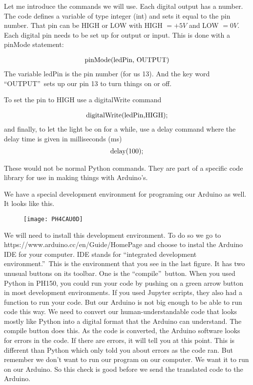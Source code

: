 Let me introduce the commands we will use. Each digital output has a number.
The code defines a variable of type integer (int) and sets it equal to the
pin number. That pin can be HIGH or LOW with HIGH $=+5\unit{V}$ and LOW $=0%
\unit{V}$. Each digital pin needs to be set up for output or input. This is
done with a pinMode statement:

\begin{equation*}
\begin{tabular}{l}
pinMode(ledPin, OUTPUT)%
\end{tabular}%
\end{equation*}%
The variable ledPin is the pin number (for us 13). And the key word
\textquotedblleft OUTPUT\textquotedblright\ sets up our pin 13 to turn
things on or off.

To set the pin to HIGH use a digitalWrite command

\begin{equation*}
\begin{tabular}{l}
digitalWrite(ledPin,HIGH);%
\end{tabular}%
\end{equation*}%
and finally, to let the light be on for a while, use a delay command where
the delay time is given in milliseconds (ms)%
\begin{equation*}
\begin{tabular}{l}
delay(100);%
\end{tabular}%
\end{equation*}

These would not be normal Python commands. They are part of a specific code
library for use in making things with Arduino's.

We have a special development environment for programing our Arduino as
well. It looks like this. \begin{figure}[h!]
\texttt{[image: PH4CAU0D]}
\end{figure}We will need to install this
development environment. To do so we go to
https://www.arduino.cc/en/Guide/HomePage and choose to instal the Arduino
IDE for your computer. IDE stands for \textquotedblleft integrated
development environment.\textquotedblright\ This is the environment that you
see in the last figure. It has two unusual buttons on its toolbar. One is
the \textquotedblleft compile\textquotedblright\ button. When you used
Python in PH150, you could run your code by pushing on a green arrow button
in most development environments. If you used Jupyter scripts, they also had
a function to run your code. But our Arduino is not big enough to be able to
run code this way. We need to convert our human-understandable code that
looks mostly like Python into a digital format that the Arduino can
understand. The compile button does this. As the code is converted, the
Arduino software looks for errors in the code. If there are errors, it will
tell you at this point. This is different than Python which only told you
about errors as the code ran. But remember we don't want to run our program
on our computer. We want it to run on our Arduino. So this check is good
before we send the translated code to the Arduino.

